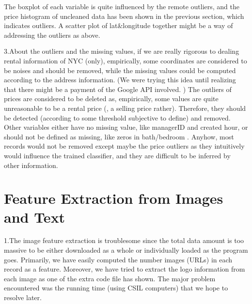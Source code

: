 \documentclass[12pt,twocolumn,letterpaper]{article}
\begin{document}
The boxplot of each variable is quite influenced by the remote outliers, and the price histogram of uncleaned data has been shown in the previous section, which indicates outliers. A scatter plot of lat&longitude together might be a way of addressing the outliers as above. 




3.About the outliers and the missing values, if we are really rigorous to dealing rental information of NYC (only), empirically, some coordinates are considered to be noises and should be removed, while the missing values could be computed according to the address information. (We were trying this idea until realizing that there might be a payment of the Google API involved. ) The outliers of prices are considered to be deleted as, empirically, some values are quite unreasonable to be a rental price (, a selling price rather). Therefore, they should be detected (according to some threshold subjective to define) and removed. 
Other variables either have no missing value, like managerID and created hour, or should not be defined as missing, like zeros in bath/bedroom . Anyhow, most records would not be removed except maybe the price outliers as they intuitively would influence the trained classifier, and they are difficult to be inferred by other information.










\section{Feature Extraction from Images and Text}
1.The image feature extraction is troublesome since the total data amount is too massive to be either downloaded as a whole or individually  loaded as the program goes. Primarily, we have easily computed the number images (URLs) in each record as a feature. Moreover, we have tried to extract the logo information from each image as one of the extra code file has shown. The major problem encountered was the running time (using CSIL computers) that we hope to resolve later.
\end{document}
